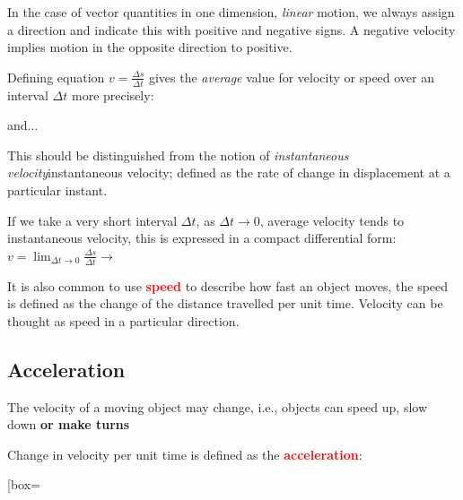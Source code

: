 \documentclass[a4paper,12pt]{book}
\newenvironment{ilight}
  {\centering
  	\vspace*{6pt}
  	\begin{tcolorbox}[colframe=Gray,colback=LightGrey!15]
  \setlength{\baselineskip}{\baselineskip}%
  }
  {\end{tcolorbox}\vspace*{-4pt}}
\newcommand{\keypoint}[1]{\textbf{\textcolor{red}{#1}}}
\newcommand{\ra}{\rightarrow}
\newcommand{\tcbhighmath}[1]{\boxed{#1}}
\newcommand{\keypoint}[1]{\textbf{\textcolor{red}{#1}}}
\begin{document}
In the case of vector quantities in one dimension, \emph{linear} motion, we always assign a direction and indicate this with positive and negative signs. A negative velocity implies motion in the opposite direction to positive.

Defining equation $v=\frac{\Delta s}{\Delta t}$ gives the \emph{average} value for velocity or speed over an interval $\Delta t$ more precisely:  and... 

This should be distinguished from the notion of \emph{instantaneous velocity}instantaneous velocity; defined as the rate of change in displacement at a particular instant.

If we take a very short interval $\Delta t$, as $\Delta t \to 0$, average velocity tends to instantaneous velocity, this is expressed in a compact differential form: $v = \lim_{\Delta t \to 0} \frac{\Delta s}{\Delta t} \ra$ 

\newpage

It is also common to use \keypoint{speed} to describe how fast an object moves, the speed is defined as the change of the distance travelled per unit time. Velocity can be thought as speed in a particular direction.

 

\subsection{Acceleration}

The velocity of a moving object may change, i.e., objects can speed up, slow down \textbf{or make turns}

\begin{ilight}
	\centering Change in velocity per unit time is defined as the \keypoint{acceleration}: \begin{empheq}[box=\tcbhighmath]{equation*}{a = \frac{\Delta v}{\Delta t}}\end{empheq}
\end{ilight}
\end{document}

